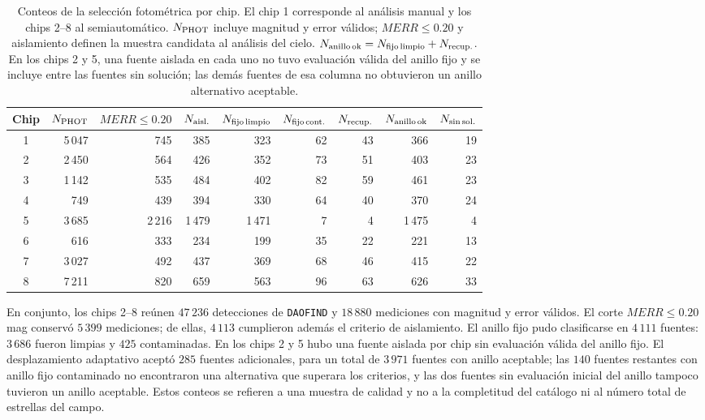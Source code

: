 \documentclass[12pt,letterpaper,oneside]{book}
\begin{document}
\begin{table}[H]
\centering
\scriptsize
\begin{tabular}{crrrrrrrr}
\toprule
Chip & $N_{\rm PHOT}$ & $MERR\leq0.20$ & $N_{\rm aisl.}$ & $N_{\rm fijo\,limpio}$ & $N_{\rm fijo\,cont.}$ & $N_{\rm recup.}$ & $N_{\rm anillo\,ok}$ & $N_{\rm sin\,sol.}$ \\
\midrule
1 & 5\,047 & 745 & 385 & 323 & 62 & 43 & 366 & 19 \\
2 & 2\,450 & 564 & 426 & 352 & 73 & 51 & 403 & 23 \\
3 & 1\,142 & 535 & 484 & 402 & 82 & 59 & 461 & 23 \\
4 & 749 & 439 & 394 & 330 & 64 & 40 & 370 & 24 \\
5 & 3\,685 & 2\,216 & 1\,479 & 1\,471 & 7 & 4 & 1\,475 & 4 \\
6 & 616 & 333 & 234 & 199 & 35 & 22 & 221 & 13 \\
7 & 3\,027 & 492 & 437 & 369 & 68 & 46 & 415 & 22 \\
8 & 7\,211 & 820 & 659 & 563 & 96 & 63 & 626 & 33 \\
\bottomrule
\end{tabular}
\caption{Conteos de la selección fotométrica por chip. El chip 1 corresponde al análisis manual y los chips 2--8 al semiautomático. $N_{\rm PHOT}$ incluye magnitud y error válidos; $MERR\leq0.20$ y aislamiento definen la muestra candidata al análisis del cielo. $N_{\rm anillo\,ok}=N_{\rm fijo\,limpio}+N_{\rm recup.}$. En los chips 2 y 5, una fuente aislada en cada uno no tuvo evaluación válida del anillo fijo y se incluye entre las fuentes sin solución; las demás fuentes de esa columna no obtuvieron un anillo alternativo aceptable.}
\label{tab:sextans-resultados}
\end{table}

En conjunto, los chips 2--8 reúnen $47\,236$ detecciones de \texttt{DAOFIND} y $18\,880$ mediciones con magnitud y error válidos. El corte $MERR\leq0.20$ mag conservó $5\,399$ mediciones; de ellas, $4\,113$ cumplieron además el criterio de aislamiento. El anillo fijo pudo clasificarse en $4\,111$ fuentes: $3\,686$ fueron limpias y $425$ contaminadas. En los chips 2 y 5 hubo una fuente aislada por chip sin evaluación válida del anillo fijo. El desplazamiento adaptativo aceptó $285$ fuentes adicionales, para un total de $3\,971$ fuentes con anillo aceptable; las $140$ fuentes restantes con anillo fijo contaminado no encontraron una alternativa que superara los criterios, y las dos fuentes sin evaluación inicial del anillo tampoco tuvieron un anillo aceptable. Estos conteos se refieren a una muestra de calidad y no a la completitud del catálogo ni al número total de estrellas del campo.
\end{document}
